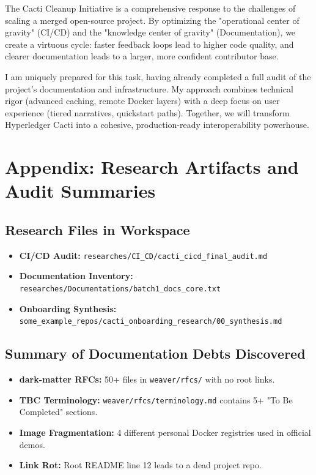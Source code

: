 The Cacti Cleanup Initiative is a comprehensive response to the challenges of scaling a merged open-source project. By optimizing the "operational center of gravity" (CI/CD) and the "knowledge center of gravity" (Documentation), we create a virtuous cycle: faster feedback loops lead to higher code quality, and clearer documentation leads to a larger, more confident contributor base.

I am uniquely prepared for this task, having already completed a full audit of the project's documentation and infrastructure. My approach combines technical rigor (advanced caching, remote Docker layers) with a deep focus on user experience (tiered narratives, quickstart paths). Together, we will transform Hyperledger Cacti into a cohesive, production-ready interoperability powerhouse.

\section{Appendix: Research Artifacts and Audit Summaries}

\subsection{Research Files in Workspace}
\begin{itemize}
    \item \textbf{CI/CD Audit:} \texttt{researches/CI\_CD/cacti\_cicd\_final\_audit.md}
    \item \textbf{Documentation Inventory:} \texttt{researches/Documentations/batch1\_docs\_core.txt}
    \item \textbf{Onboarding Synthesis:} \texttt{some\_example\_repos/cacti\_onboarding\_research/00\_synthesis.md}
\end{itemize}

\subsection{Summary of Documentation Debts Discovered}
\begin{itemize}
    \item \textbf{dark-matter RFCs:} 50+ files in \texttt{weaver/rfcs/} with no root links.
    \item \textbf{TBC Terminology:} \texttt{weaver/rfcs/terminology.md} contains 5+ "To Be Completed" sections.
    \item \textbf{Image Fragmentation:} 4 different personal Docker registries used in official demos.
    \item \textbf{Link Rot:} Root README line 12 leads to a dead project repo.
\end{itemize}
